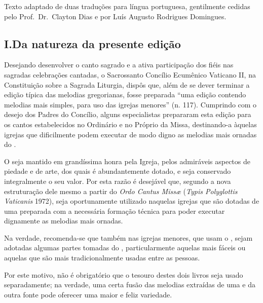 \AllowPageFlush

\label{section:praenotanda}

\begin{center}
  \begin{rubrica}
    Texto adaptado de duas traduções para língua portuguesa, gentilmente cedidas pelo Prof.\ Dr.\ Clayton Dias e por Luís Augusto Rodrigues Domingues.
  \end{rubrica}
\end{center}

\subsection{I.\@ Da natureza da presente edição}\label{subsection:praenotanda-1}

 Desejando desenvolver o canto sagrado e a ativa participação dos fiéis nas sagradas celebrações cantadas, o Sacrossanto Concílio Ecumênico Vaticano II, na Constituição sobre a Sagrada Liturgia, dispôs que, além de se dever terminar a edição típica das melodias gregorianas, fosse preparada ``uma edição contendo melodias mais simples, para uso das igrejas menores'' (n. 117). Cumprindo com o desejo dos Padres do Concílio, alguns especialistas prepararam esta edição para os cantos estabelecidos no  Ordinário e no Próprio da Missa, destinando-a àquelas igrejas que dificilmente podem executar de modo digno as melodias mais ornadas do {\GR}.

 O {\GR} seja mantido em grandíssima honra pela Igreja, pelos admiráveis aspectos de piedade e de arte, dos quais é abundantemente dotado, e seja conservado integralmente o seu valor. Por esta razão é desejável que, segundo a nova estruturação dele mesmo a partir do \emph{Ordo Cantus Missæ} (\emph{Typis Polyglottis Vaticanis} 1972), seja oportunamente utilizado naquelas igrejas que são dotadas de uma {\ScholaC} preparada com a necessária formação técnica para poder executar dignamente as melodias mais ornadas.

Na verdade, recomenda-se que também nas igrejas menores, que usam o {\GS}, sejam  adotadas algumas partes tomadas do {\GR}, particularmente aquelas mais fáceis ou aquelas que são mais tradicionalmente usadas entre as pessoas.

 Por este motivo, não é obrigatório que o tesouro destes dois livros seja usado separadamente; na verdade, uma certa fusão das melodias extraídas de uma e da outra fonte pode oferecer uma maior e feliz variedade.

